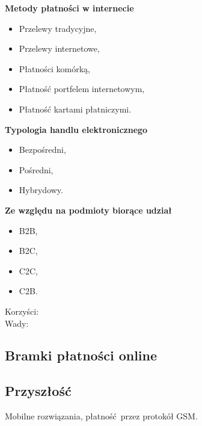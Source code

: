 \noindent
\textbf{Metody płatności w internecie}
\begin{itemize}
	\item Przelewy tradycyjne,
	\item Przelewy internetowe,
	\item Płatności komórką,
	\item Płatność portfelem internetowym,
	\item Płatność kartami płatniczymi.
\end{itemize}

\noindent
\textbf{Typologia handlu elektronicznego}
\begin{itemize}
	\item Bezpośredni,
	\item Pośredni,
	\item Hybrydowy.
\end{itemize}

\noindent
\textbf{Ze względu na podmioty biorące udział}
\begin{itemize}
	\item B2B,
	\item B2C,
	\item C2C,
	\item C2B.
\end{itemize}

Korzyści:\\

Wady:\\


\subsection{Bramki płatności online}


\subsection{Przyszłość}


Mobilne rozwiązania, płatność przez protokół GSM.
